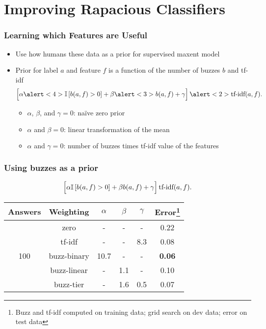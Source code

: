 

\section{Improving Rapacious Classifiers}

\begin{frame}
	\frametitle{Learning which Features are Useful}

	\begin{itemize}
		\item Use how humans these data as a prior for supervised maxent model~\cite{daume-04}
		\item Prior for label $a$ and feature $f$ is a function of the number of buzzes $b$ and tf-idf~\cite{salton-68}
\begin{equation}
  \left[ \vphantom{\frac{a}{b}}\alpha \alert<4>{\ind{ b(a,f) > 0}} + \beta \alert<3>{ b(a,f)} + \gamma
  \right] \alert<2>{\mbox{tf-idf}(a,f)} .
\label{eq:meanweight}
\end{equation}
		\begin{itemize}
			\item $\alpha$, $\beta$, and $\gamma = 0$: na\"ive zero prior
			\item $\alpha$ and $\beta = 0$: linear transformation of the mean
			\item $\alpha$ and $\gamma = 0$: number of buzzes times tf-idf value of the features
		\end{itemize}

	\end{itemize}

\end{frame}

\begin{frame}
	\frametitle{Using buzzes as a prior}

\begin{equation*}
  \left[ \vphantom{\frac{a}{b}}\alpha \ind{ b(a,f) > 0} + \beta b(a,f) + \gamma
  \right] \mbox{tf-idf}(a,f) .
\end{equation*}

\begin{center}
\begin{tabular}{cccccc}
Answers & Weighting & $\alpha$ & $\beta$ & $\gamma$ & Error\footnote{Buzz and tf-idf computed on training data; grid search on dev data; error on test data} \\
\hline
\multirow{5}{*}{100} & zero & - & - & - & 0.22 \\
& tf-idf & - & - & 8.3 & 0.08 \\
&  buzz-binary & 10.7 & - & - & {\bf 0.06} \\
&  buzz-linear & - &  1.1 & - & 0.10 \\
& buzz-tier & - & 1.6 & 0.5 & 0.07 \\
\hline
\end{tabular}
\end{center}
\end{frame}


